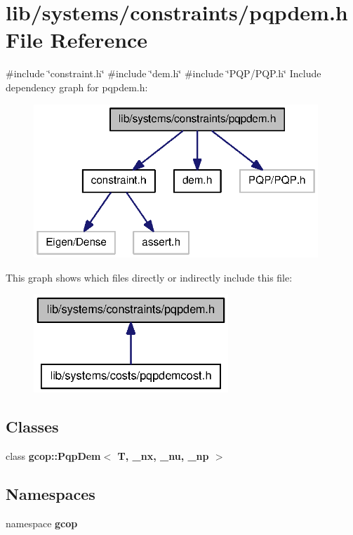 \section{lib/systems/constraints/pqpdem.h \-File \-Reference}
\label{pqpdem_8h}
{\ttfamily \#include \char`\"{}constraint.\-h\char`\"{}}\*
{\ttfamily \#include \char`\"{}dem.\-h\char`\"{}}\*
{\ttfamily \#include \char`\"{}\-P\-Q\-P/\-P\-Q\-P.\-h\char`\"{}}\*
\-Include dependency graph for pqpdem.\-h\-:\nopagebreak
\begin{figure}[H]
\begin{center}
\leavevmode
\includegraphics[width=304pt]{pqpdem_8h__incl}
\end{center}
\end{figure}
\-This graph shows which files directly or indirectly include this file\-:\nopagebreak
\begin{figure}[H]
\begin{center}
\leavevmode
\includegraphics[width=208pt]{pqpdem_8h__dep__incl}
\end{center}
\end{figure}
\subsection*{\-Classes}
\begin{DoxyCompactItemize}
\item 
class {\bf gcop\-::\-Pqp\-Dem$<$ T, \-\_\-nx, \-\_\-nu, \-\_\-np $>$}
\end{DoxyCompactItemize}
\subsection*{\-Namespaces}
\begin{DoxyCompactItemize}
\item 
namespace {\bf gcop}
\end{DoxyCompactItemize}
